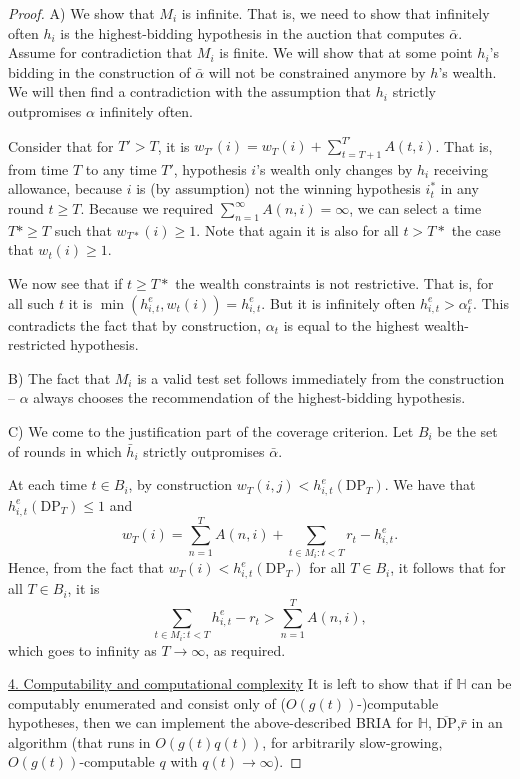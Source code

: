 \documentclass[submission,copyright,creativecommons]{eptcs}
\newcommand{\DP}{\mathrm{DP}}
\begin{document}
\begin{proof}
A) We show that $M_i$ is infinite. That is, we need to show that infinitely often $h_i$ is the highest-bidding hypothesis in the auction that computes $\bar\alpha$. Assume for contradiction that $M_i$ is finite. We will show that at some point $h_i$'s bidding in the construction of $\bar \alpha$ will not be constrained anymore by $h$'s wealth. We will then find a contradiction with the assumption that $h_i$ strictly outpromises $\alpha$ infinitely often.

Consider that for $T'>T$, it is $w_{T'}(i) = w_T(i) + \sum_{t=T+1}^{T'} A(t, i)$. That is, from time $T$ to any time $T'$, hypothesis $i$'s wealth only changes by $h_i$ receiving allowance, because $i$ is (by assumption) not the winning hypothesis $i^*_t$ in any round $t\geq T$. Because we required $\sum_{n=1}^\infty A(n,i)=\infty$, we can select a time $T*\geq T$ such that $w_{T*}(i)\geq 1$. Note that again it is also for all $t>T*$ the case that $w_{t}(i)\geq 1$.
    
We now see that if $t\geq T*$ the wealth constraints is not restrictive. That is, for all such $t$ it is $\min (h_{i,t}^e , w_t(i))=h_{i,t}^e$.
But it is infinitely often $h_{i,t}^e>\alpha_t^e$. This contradicts the fact that by construction, $\alpha_t$ is equal to the highest wealth-restricted hypothesis.
 
B) The fact that $M_i$ is a valid test set follows immediately from the construction -- $\alpha$ always chooses the recommendation of the highest-bidding hypothesis. 
    
C) We come to the justification part of the coverage criterion. Let $B_i$ be the set of rounds in which $\bar h _i$ strictly outpromises $\bar \alpha$. %
%
%
%
%

At each time $t\in B_i$, by construction $w_T(i,j)<h_{i,t}^e(\DP_T)$.
We have that $h_{i,t}^e(\DP_T)\leq 1$ and
\begin{equation*}
    w_T(i) = \sum_{n=1}^{T} A(n, i) +  \sum_{t\in M_i :t<T} r_t - h_{i,t}^e.
\end{equation*}
Hence, from the fact that $w_T(i)<h_{i,t}^e(\DP_T)$ for all $T\in B_i$, it follows that for all $T\in B_i$, it is
\begin{equation*}
    \sum_{t\in M_i:t<T}  h_{i,t}^e - r_t > \sum_{n=1}^{T} A(n, i),
\end{equation*}
which goes to infinity as $T\rightarrow \infty$, as required.\\


%

\begin{sloppypar}
\underline{4. Computability and computational complexity} It is left to show that if $\mathbb{H}$ can be computably enumerated and consist only of ($O(g(t))$-)computable hypotheses, then we can implement the above-described BRIA for $\mathbb{H}$, $\overline{\DP}$,$\bar r$ in an algorithm (that runs in $O(g(t)q(t))$, for arbitrarily slow-growing, $O(g(t))$-computable $q$ with $q(t)\rightarrow\infty$).
\end{sloppypar}


\end{proof}
\end{document}
